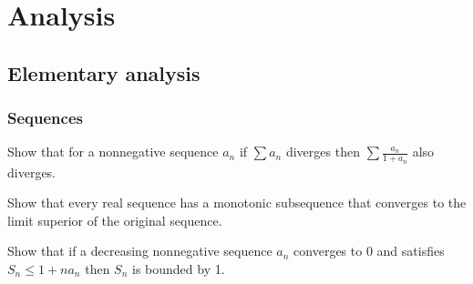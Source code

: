 \documentclass[11pt]{report}
\let\realsection\section
\renewcommand\section{\realsection}
\begin{document}
\tableofcontents

\chapter{Analysis}
\section{Elementary analysis}

\subsection{Sequences}
\begin{cond}
\item Show that for a nonnegative sequence $a_n$ if $\sum a_n$ diverges then $\sum\frac{a_n}{1+a_n}$ also diverges.
\item Show that every real sequence has a monotonic subsequence that converges to the limit superior of the original sequence.
\item Show that if a decreasing nonnegative sequence $a_n$ converges to 0 and satisfies $S_n\le1+na_n$ then $S_n$ is bounded by 1.
\end{cond}
\end{document}
